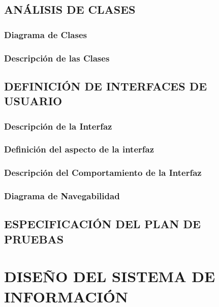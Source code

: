 \documentclass[11pt]{report}
\begin{document}
\newpage
\section{ANÁLISIS DE CLASES}

\subsection{Diagrama de Clases} 

\subsection{Descripción de las Clases}


\newpage
\section{DEFINICIÓN DE INTERFACES DE USUARIO}

\subsection{Descripción de la Interfaz} 

\subsection{Definición del aspecto de la interfaz}

\subsection{Descripción del Comportamiento de la Interfaz} 

\subsection{Diagrama de Navegabilidad}


\newpage
\section{ESPECIFICACIÓN DEL PLAN DE PRUEBAS}


\newpage
\chapter{DISEÑO DEL SISTEMA DE INFORMACIÓN}
\noindent{}
\end{document}
